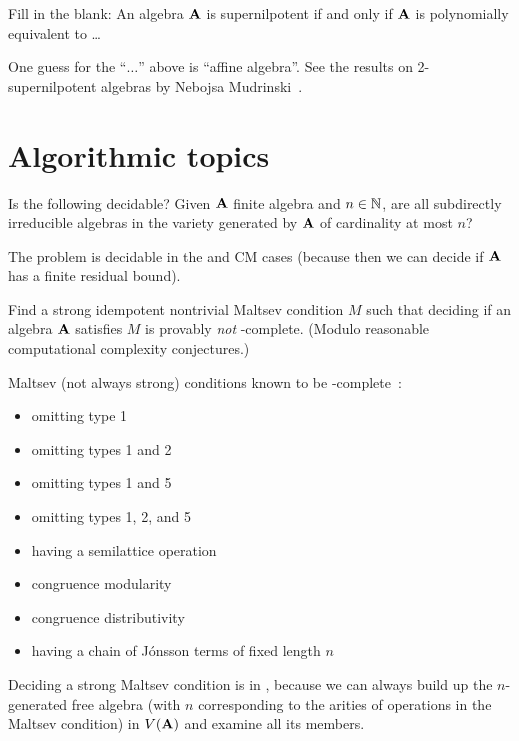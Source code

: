 \begin{question}\label{qSupernilpotent}
  Fill in the blank: An algebra ${\mathbf{A}}$ is supernilpotent if and only if
  ${\mathbf{A}}$ is polynomially equivalent to \dots
\end{question}
\begin{context}
  One guess for the ``$\dots$'' above is ``affine algebra''. See the results on
  2-supernilpotent algebras by Nebojsa Mudrinski~\cite{nebojsa}.
\end{context}


\section{Algorithmic topics}
\begin{question}
  Is the following decidable? Given ${\mathbf{A}}$ finite algebra and $n\in \mathbb{N}$, are
all subdirectly irreducible algebras in the variety generated by ${\mathbf{A}}$ of
cardinality at most $n$?
\end{question}
\begin{context}
  The problem is decidable in the \SDmeet{} and CM cases (because then we can
decide if ${\mathbf{A}}$ has a finite residual bound).
\end{context}
\begin{question}
  Find a strong idempotent nontrivial Maltsev condition $M$ such that deciding
  if an algebra ${\mathbf{A}}$ satisfies $M$ is provably \emph{not}
  \compEXPTIME-complete. (Modulo reasonable computational complexity conjectures.)
\end{question}
\begin{context}
  Maltsev (not always strong) conditions known to be \compEXPTIME-complete~\cite{freese-valeriote-complexity}:
  \begin{itemize}
    \item omitting type 1
    \item omitting types 1 and 2
    \item omitting types 1 and 5
    \item omitting types 1, 2, and 5
    \item having a semilattice operation
    \item congruence modularity
    \item congruence distributivity
    \item having a chain of Jónsson terms of fixed length $n$
  \end{itemize}

  Deciding a strong Maltsev condition is in \compEXPTIME, because we can always
  build up the $n$-generated free algebra (with $n$ corresponding to the
  arities of operations in the Maltsev condition) in $V({\mathbf{A}})$ and examine all its members.
\end{context}
